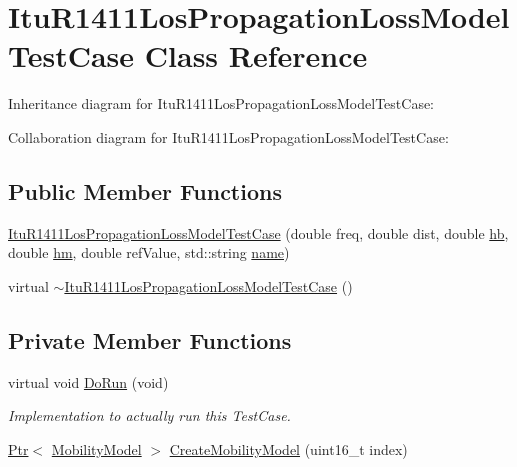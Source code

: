 \hypertarget{classItuR1411LosPropagationLossModelTestCase}{}\section{Itu\+R1411\+Los\+Propagation\+Loss\+Model\+Test\+Case Class Reference}
\label{classItuR1411LosPropagationLossModelTestCase}


Inheritance diagram for Itu\+R1411\+Los\+Propagation\+Loss\+Model\+Test\+Case\+:


Collaboration diagram for Itu\+R1411\+Los\+Propagation\+Loss\+Model\+Test\+Case\+:
\subsection*{Public Member Functions}
\begin{DoxyCompactItemize}
\item 
\hyperlink{classItuR1411LosPropagationLossModelTestCase_a20f776cecb8cf923c31e710d0f329e83}{Itu\+R1411\+Los\+Propagation\+Loss\+Model\+Test\+Case} (double freq, double dist, double \hyperlink{lte__pathloss_8m_a193c482b47dea4d7243e253acc8b2bee}{hb}, double \hyperlink{lte__pathloss_8m_adf48bfd0f3afa8972e753a0f895b0a51}{hm}, double ref\+Value, std\+::string \hyperlink{generate__test__data__lte__spectrum__model_8m_ab74e6bf80237ddc4109968cedc58c151}{name})
\item 
virtual \hyperlink{classItuR1411LosPropagationLossModelTestCase_a47e3cb59dcde47e4b99582285b72d81c}{$\sim$\+Itu\+R1411\+Los\+Propagation\+Loss\+Model\+Test\+Case} ()
\end{DoxyCompactItemize}
\subsection*{Private Member Functions}
\begin{DoxyCompactItemize}
\item 
virtual void \hyperlink{classItuR1411LosPropagationLossModelTestCase_a13bfa897fc98c45a328bf90f0f648249}{Do\+Run} (void)
\begin{DoxyCompactList}\small\item\em Implementation to actually run this Test\+Case. \end{DoxyCompactList}\item 
\hyperlink{classns3_1_1Ptr}{Ptr}$<$ \hyperlink{classns3_1_1MobilityModel}{Mobility\+Model} $>$ \hyperlink{classItuR1411LosPropagationLossModelTestCase_aa17813a79785aff8ee8b2bb0a32a37c6}{Create\+Mobility\+Model} (uint16\+\_\+t index)
\end{DoxyCompactItemize}
